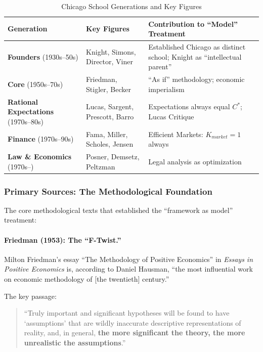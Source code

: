 \begin{table}[htbp]
\centering
\caption{Chicago School Generations and Key Figures}
\label{tab:chicago-generations}
\renewcommand{\arraystretch}{1.3}
\small
\begin{tabular}{@{}llp{6cm}@{}}
\toprule
\textbf{Generation} & \textbf{Key Figures} & \textbf{Contribution to ``Model'' Treatment} \\
\midrule
\textbf{Founders} (1930s--50s) & Knight, Simons, Director, Viner &
    Established Chicago as distinct school; Knight as ``intellectual parent'' \citep{medema2023chicago} \\
\textbf{Core} (1950s--70s) & Friedman, Stigler, Becker &
    ``As if'' methodology; economic imperialism \\
\textbf{Rational Expectations} (1970s--80s) & Lucas, Sargent, Prescott, Barro &
    Expectations always equal $C^*$; Lucas Critique \\
\textbf{Finance} (1970s--90s) & Fama, Miller, Scholes, Jensen &
    Efficient Markets: $K_{market} = 1$ always \\
\textbf{Law \& Economics} (1970s--) & Posner, Demsetz, Peltzman &
    Legal analysis as optimization \\
\bottomrule
\end{tabular}
\end{table}

\subsubsection{Primary Sources: The Methodological Foundation}

The core methodological texts that established the ``framework as model'' treatment:

\paragraph{Friedman (1953): The ``F-Twist.''}
Milton Friedman's essay ``The Methodology of Positive Economics'' in \textit{Essays in
Positive Economics} \citep{friedman1953essays} is, according to Daniel Hausman, ``the most
influential work on economic methodology of [the twentieth] century.''

The key passage:
\begin{quote}
``Truly important and significant hypotheses will be found to have `assumptions' that
are wildly inaccurate descriptive representations of reality, and, in general,
\textbf{the more significant the theory, the more unrealistic the assumptions}.''
\end{quote}

